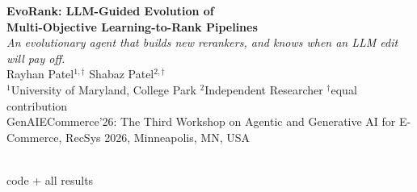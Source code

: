\documentclass{article}
\newcommand{\TitleSize}{\fontsize{84}{92}\selectfont}
\newcommand{\AuthorSize}{\fontsize{46}{56}\selectfont}
\newcommand{\BodySize}{\fontsize{30}{40}\selectfont}
\newcommand{\SmallSize}{\fontsize{25}{33}\selectfont}
\begin{document}
\BodySize
\begin{tcolorbox}[enhanced,colback=accent,colframe=accent,arc=5mm,
  left=12mm,right=12mm,top=10mm,bottom=10mm]
\begin{minipage}[c]{0.855\textwidth}\color{white}
{\TitleSize\bfseries EvoRank: LLM-Guided Evolution of\\[2mm]
Multi-Objective Learning-to-Rank Pipelines}\\[4mm]
{\fontsize{40}{48}\selectfont\itshape An evolutionary agent that builds new
rerankers, and knows when an LLM edit will pay off.}\\[6mm]
{\AuthorSize Rayhan Patel$^{1,\dagger}$ \quad Shabaz Patel$^{2,\dagger}$}\\[4mm]
{\SmallSize $^{1}$University of Maryland, College Park \quad $^{2}$Independent Researcher
\quad $^{\dagger}$equal contribution\\[2mm]
GenAIECommerce'26: The Third Workshop on Agentic and Generative AI for E-Commerce,
RecSys 2026, Minneapolis, MN, USA}
\end{minipage}\hfill
\begin{minipage}[c]{0.115\textwidth}\centering
\colorbox{white}{}\\[3mm]
{\color{white}\SmallSize code + all results}
\end{minipage}
\end{tcolorbox}
\vspace{6mm}
\end{document}
